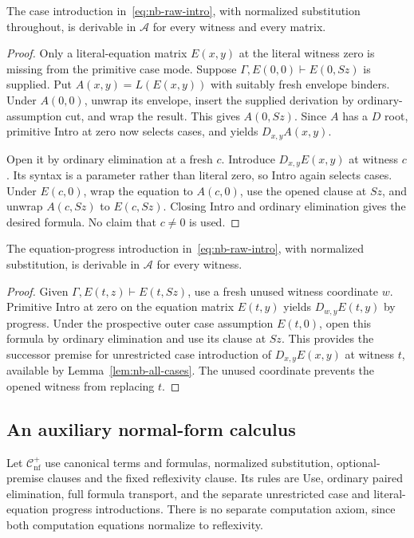 \begin{lemma}
\label{lem:nb-all-cases}
The case introduction in~\eqref{eq:nb-raw-intro}, with normalized
substitution throughout, is derivable in $\mathcal A$ for every witness
and every matrix.
\end{lemma}
\begin{proof}
Only a literal-equation matrix $E(x,y)$ at the literal witness zero
is missing from the primitive case mode. Suppose
$\Gamma,E(0,0)\vdash E(0,Sz)$ is supplied. Put
$A(x,y)=L(E(x,y))$ with suitably fresh envelope binders. Under
$A(0,0)$, unwrap its envelope, insert the supplied derivation by
ordinary-assumption cut, and wrap the result. This gives $A(0,Sz)$.
Since $A$ has a $D$ root, primitive Intro at zero now selects cases,
and yields $D_{x,y}A(x,y)$.

Open it by ordinary elimination at a fresh $c$. Introduce
$D_{x,y}E(x,y)$ at witness $c$. Its syntax is a parameter rather than
literal zero, so Intro again selects cases. Under $E(c,0)$, wrap the
equation to $A(c,0)$, use the opened clause at $Sz$, and unwrap
$A(c,Sz)$ to $E(c,Sz)$. Closing Intro and ordinary elimination gives
the desired formula. No claim that $c\ne0$ is used.
\end{proof}

\begin{lemma}
\label{lem:nb-all-progress}
The equation-progress introduction in~\eqref{eq:nb-raw-intro}, with
normalized substitution, is derivable in $\mathcal A$ for every witness.
\end{lemma}
\begin{proof}
Given $\Gamma,E(t,z)\vdash E(t,Sz)$, use a fresh unused witness
coordinate $w$. Primitive Intro at zero on the equation matrix
$E(t,y)$ yields $D_{w,y}E(t,y)$ by progress. Under the prospective
outer case assumption $E(t,0)$, open this formula by ordinary
elimination and use its clause at $Sz$. This provides the successor
premise for unrestricted case introduction of $D_{x,y}E(x,y)$
at witness $t$, available by Lemma~\ref{lem:nb-all-cases}.
The unused coordinate prevents the opened witness from replacing $t$.
\end{proof}

\subsection{An auxiliary normal-form calculus}

Let $\mathcal C_{\mathrm{nf}}^+$ use canonical terms and formulas,
normalized substitution, optional-premise clauses and the fixed
reflexivity clause. Its rules are Use, ordinary paired elimination,
full formula transport, and the separate unrestricted case and
literal-equation progress introductions. There is no separate
computation axiom, since both computation equations normalize to
reflexivity.

